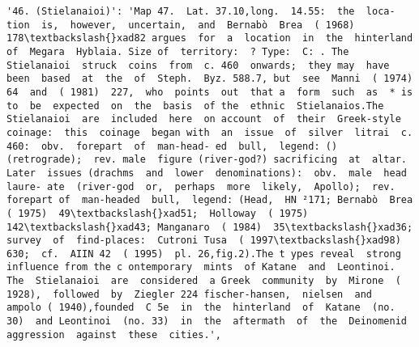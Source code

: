 \documentclass[11pt]{article}
\begin{document}
\begin{Verbatim}[commandchars=\\\{\}]
         '46. (Stielanaioi)': 'Map 47.  Lat. 37.10,long.  14.55:  the  loca- tion  is,  however,  uncertain,  and  Bernabò  Brea  ( 1968)  178\textbackslash{}xad82 argues  for  a  location  in  the  hinterland  of  Megara  Hyblaia. Size of  territory:  ? Type:  C: . The  Stielanaioi  struck  coins  from  c. 460  onwards;  they may  have  been  based  at  the  of  Steph.  Byz. 588.7, but  see  Manni  ( 1974)  64  and  ( 1981)  227,  who  points  out  that a  form  such  as  * is  to  be  expected  on  the  basis  of the  ethnic  Stielanaios.The  Stielanaioi  are  included  here  on account  of  their  Greek-style  coinage:  this  coinage  began with  an  issue  of  silver  litrai  c. 460:  obv.  forepart  of  man-head- ed  bull,  legend: () (retrograde);  rev. male  figure (river-god?) sacrificing  at  altar.  Later  issues (drachms  and  lower  denominations):  obv.  male  head  laure- ate  (river-god  or,  perhaps  more  likely,  Apollo);  rev.  forepart of  man-headed  bull,  legend: (Head,  HN ²171; Bernabò  Brea  ( 1975)  49\textbackslash{}xad51;  Holloway  ( 1975)  142\textbackslash{}xad43; Manganaro  ( 1984)  35\textbackslash{}xad36;  survey  of  find-places:  Cutroni Tusa  ( 1997\textbackslash{}xad98)  630;  cf.  AIIN 42  ( 1995)  pl. 26,fig.2).The t ypes reveal  strong  influence from the c ontemporary  mints  of Katane  and  Leontinoi.  The  Stielanaioi  are  considered  a Greek  community  by  Mirone  ( 1928),  followed  by  Ziegler 224 fischer-hansen,  nielsen  and  ampolo ( 1940),founded  C 5e  in  the  hinterland  of  Katane  (no. 30)  and Leontinoi  (no. 33)  in  the  aftermath  of  the  Deinomenid aggression  against  these  cities.',

\end{Verbatim}
\end{document}
